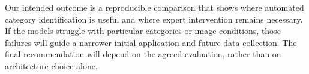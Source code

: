 \documentclass[conference,letterpaper]{IEEEtran}
\begin{document}
Our intended outcome is a reproducible comparison that shows where automated category identification is useful and where expert intervention remains necessary. If the models struggle with particular categories or image conditions, those failures will guide a narrower initial application and future data collection. The final recommendation will depend on the agreed evaluation, rather than on architecture choice alone.

\clearpage
{}


\end{document}
